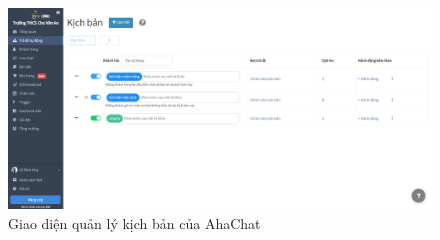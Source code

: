 \begin{figure}[H]
    \centering
    \includegraphics[width=1\linewidth]{Images/quanlykichbanahachat.png}
    \vspace{0.5cm}
    \caption{Giao diện quản lý kịch bản của AhaChat}
    \label{fig:enter-label}
\end{figure}
